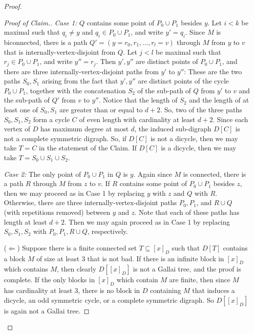 \documentclass[psamsfonts]{amsart}
\theoremstyle{definition}
\theoremstyle{remark}
\numberwithin{equation}{section}
\begin{document}
\begin{proof}
\begin{proof}[Proof of Claim.]
    {\it Case 1:} $Q$ contains some point of $P_0 \cup P_1$ besides $y$. Let $i < k$ be maximal such that $q_i \neq y$ and $q_i \in P_0 \cup P_1$, and write $y' = q_i$. Since $M$ is biconnected, there is a path $Q' = (y = r_0, r_1, \dots, r_l = v)$ through $M$ from $y$ to $v$ that is internally-vertex-disjoint from $Q$. Let $j < l$ be maximal such that $r_j \in P_0 \cup P_1$, and write $y'' = r_j$. Then $y', y''$ are distinct points of $P_0 \cup P_1$, and there are three internally-vertex-disjoint paths from $y'$ to $y''$: These are the two paths $S_0, S_1$ arising from the fact that $y', y''$ are distinct points of the cycle $P_0 \cup P_1$, together with the concatenation $S_2$ of the sub-path of $Q$ from $y'$ to $v$ and the sub-path of $Q'$ from $v$ to $y''$. Notice that the length of $S_2$ and the length of at least one of $S_0, S_1$ are greater than or equal to $d + 2$. So, two of the three paths $S_0, S_1, S_2$ form a cycle $C$ of even length with cardinality at least $d + 2$. Since each vertex of $D$ has maximum degree at most $d$, the induced sub-digraph $D[C]$ is not a complete symmetric digraph. So, if $D[C]$ is not a dicycle, then we may take $T = C$ in the statement of the Claim. If $D[C]$ is a dicycle, then we may take $T = S_0 \cup S_1 \cup S_2$.

    {\it Case 2:} The only point of $P_0 \cup P_1$ in $Q$ is $y$. Again since $M$ is connected, there is a path $R$ through $M$ from $z$ to $v$. If $R$ contains some point of $P_0 \cup P_1$ besides $z$, then we may proceed as in Case 1 by replacing $y$ with $z$ and $Q$ with $R$. Otherwise, there are three internally-vertex-disjoint paths $P_0, P_1$, and $R \cup Q$ (with repetitions removed) between $y$ and $z$. Note that each of these paths has length at least $d + 2$. Then we may again proceed as in Case 1 by replacing $S_0, S_1, S_2$ with $P_0, P_1, R \cup Q$, respectively.
    
    ($\Leftarrow$) Suppose there is a finite connected set $T \subseteq [x]_D$ such that $D[T]$ contains a block $M$ of size at least $3$ that is not bad. If there is an infinite block in $[x]_D$ which contains $M$, then clearly $D[[x]_D]$ is not a Gallai tree, and the proof is complete. If the only blocks in $[x]_D$ which contain $M$ are finite, then since $M$ has cardinality at least $3$, there is no block in $D$ containing $M$ that induces a dicycle, an odd symmetric cycle, or a complete symmetric digraph. So $D[[x]_D]$ is again not a Gallai tree.
    \end{proof}
    

\end{proof}
\end{document}
